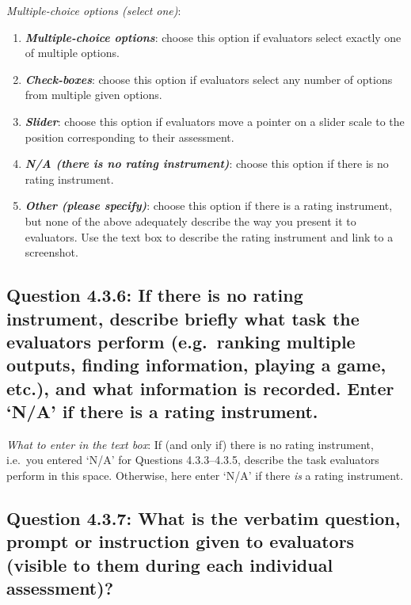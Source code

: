 \documentclass[11pt,a4paper]{article}
\newcommand{\egcvalue}[1]{\textbf{\textit{#1}}}
\begin{document}
\noindent\textit{Multiple-choice options (select one)}:  
\vspace{-.1cm}

\begin{enumerate}[itemsep=0cm,leftmargin=0.5cm,label={\LARGE $\circ$}]
    \item \egcvalue{Multiple-choice options}: choose this option if evaluators select exactly one of multiple options.
    \item \egcvalue{Check-boxes}: choose this option if evaluators select any number of options from multiple given options.
    \item \egcvalue{Slider}: choose this option if evaluators move a pointer on a slider scale to the position corresponding to their assessment.
    \item \egcvalue{N/A (there is no rating instrument)}: choose this option if there is no rating instrument.
    \item \egcvalue{Other (please specify)}: choose this option if there is a rating instrument, but none of the above adequately describe the way you present it to evaluators. Use the text box to describe the rating instrument and link to a screenshot.
\end{enumerate}

\subsection*{Question 4.3.6:  If there is no rating instrument, describe briefly what task the evaluators perform (e.g.\ ranking multiple outputs, finding information, playing a game, etc.), and what information is recorded. Enter `N/A' if there is a rating instrument.}

\noindent\textit{What to enter in the text box}:  If (and only if) there is no rating instrument, i.e.\ you entered `N/A' for Questions 4.3.3--4.3.5, describe the task evaluators perform in this space. Otherwise, here enter `N/A' if there \textit{is} a rating instrument.

\subsection*{Question 4.3.7:  What is the verbatim question, prompt or instruction given to evaluators (visible to them during each individual assessment)?  }
\end{document}
